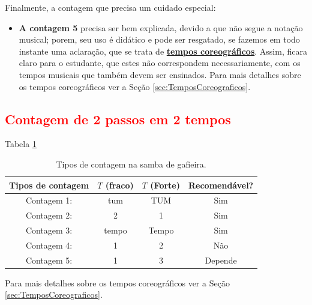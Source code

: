 Finalmente, a contagem que precisa um cuidado especial:
\begin{itemize}

\item \textbf{A contagem 5} precisa ser bem explicada, 
devido a que não segue a notação musical; 
porem, seu uso é didático e pode ser resgatado,
se fazemos em todo instante uma aclaração, 
que se trata de \hyperref[sec:TemposCoreograficos]{\textbf{tempos coreográficos}}.
Assim, ficara claro para o estudante, que estes não correspondem necessariamente, 
com os tempos musicais que também devem ser ensinados.
Para mais detalhes sobre os tempos coreográficos ver a Seção \ref{sec:TemposCoreograficos}.

\end{itemize}

\subsection{\textcolor{red}{Contagem de 2 passos em 2 tempos}}


Tabela \ref{tab:ritmoconta2}

\begin{table}[ht]
  \centering
  \begin{tabular}    {c|cc|c}
    \hline
    Tipos de contagem       & $T$ (fraco)  & $T$ (Forte)& Recomendável?\\
    \hline
    Contagem 1: & tum  & TUM  & Sim\\
    Contagem 2: & 2     & 1     & Sim\\
    Contagem 3: & tempo & Tempo & Sim\\ \hline
    Contagem 4: & 1     & 2     & Não\\ \hline
    Contagem 5: & 1     & 3     & Depende\\  \hline
    \hline
  \end{tabular}
  \caption{Tipos de contagem na samba de gafieira.}
\label{tab:ritmoconta2}
\end{table}

Para mais detalhes sobre os tempos coreográficos ver a Seção \ref{sec:TemposCoreograficos}.


